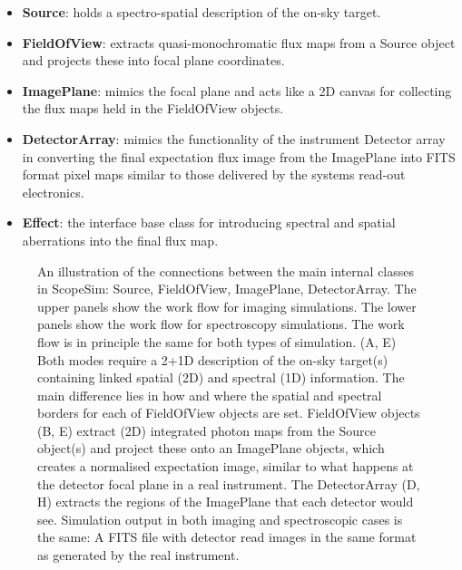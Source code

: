 \begin{itemize}
\item \textbf{Source}: holds a spectro-spatial description of the on-sky target.

\item \textbf{FieldOfView}: extracts quasi-monochromatic flux maps from a Source object and projects these into focal plane coordinates.

\item \textbf{ImagePlane}: mimics the focal plane and acts like a 2D canvas for collecting the flux maps held in the FieldOfView objects.

\item \textbf{DetectorArray}: mimics the functionality of the instrument Detector array in converting the final expectation flux image from the ImagePlane into FITS format pixel maps similar to those delivered by the systems read-out electronics.

\item \textbf{Effect}: the interface base class for introducing spectral and spatial aberrations into the final flux map.
\end{itemize}

\begin{figure}[H]
\noindent{}\label{fig-workflow}

\caption{An illustration of the connections between the main internal classes in ScopeSim: Source, FieldOfView, ImagePlane, DetectorArray.
The upper panels show the work flow for imaging simulations.
The lower panels show the work flow for spectroscopy simulations.
The work flow is in principle the same for both types of simulation.
(A, E) Both modes require a 2+1D description of the on-sky target(s) containing linked spatial (2D) and spectral (1D) information.
The main difference lies in how and where the spatial and spectral borders for each of FieldOfView objects are set.
FieldOfView objects (B, E) extract (2D) integrated photon maps from the Source object(s) and project these onto an ImagePlane objects, which creates a normalised expectation image, similar to what happens at the detector focal plane in a real instrument.
The DetectorArray (D, H) extracts the regions of the ImagePlane that each detector would see.
Simulation output in both imaging and spectroscopic cases is the same: A FITS file with detector read images in the same format as generated by the real instrument.}
\end{figure}

